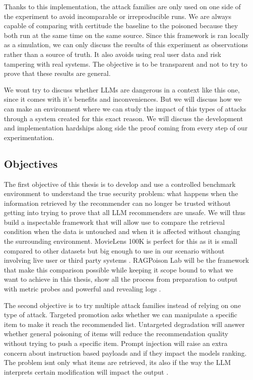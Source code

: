 Thanks to this implementation, the attack families are only used on one side of the experiment to avoid incomparable or irreproducible runs. We are always capable of comparing with certitude the baseline to the poisoned because they both run at the same time on the same source. Since this framework is ran locally as a simulation, we can only discuss the results of this experiment as observations rather than a source of truth. It also avoids using real user data and risk tampering with real systems\cite{harper2015movielens,ragpoisonlab_repo}. The objective is to be transparent and not to try to prove that these results are general.

We wont try to discuss whether LLMs are dangerous in a context like this one, since it comes with it's benefits and inconveniences. But we will discuss how we can make an environment where we can study the impact of this types of attacks through a system created for this exact reason. We will discuss the development and implementation hardships along side the proof coming from every step of our experimentation\cite{ragpoisonlab_repo}.

\subsection{Objectives}

The first objective of this thesis is to develop and use a controlled benchmark environment to understand the true security problem: what happens when the information retrieved by the recommender can no longer be trusted without getting into trying to prove that all LLM recommenders are unsafe. We will thus build a inspectable framework that will allow use  to compare the retrieval condition when the data is untouched and when it is affected without changing the surrounding environment. MovieLens 100K is perfect for this as it is small compared to other datasets but big enough to use in our scenario without involving live user or third party systems \cite{harper2015movielens}. RAGPoison Lab will be the framework that make this comparison possible while keeping it scope bound to what we want to achieve in this thesis, show all the process from preparation to output with metric probes and powerful and revealing logs \cite{ragpoisonlab_repo}.

The second objective is to try multiple attack families instead of relying on one type of attack\cite{nguyen2024manipulatingrecsys,wang2024recpoisonsurvey,ragpoisonlab_repo}. Targeted promotion asks whether we can manipulate a specific item to make it reach the recommended list. Untargeted degradation will answer whether general poisoning of items will reduce the recommendation quality without trying to push a specific item. Prompt injection will raise an extra concern about instruction based payloads and if they impact the models ranking. The problem isnt only what items are retrieved, its also if the way the LLM interprets certain modification will impact the output \cite{greshake2023indirectpi,yi2025bipia}. 

